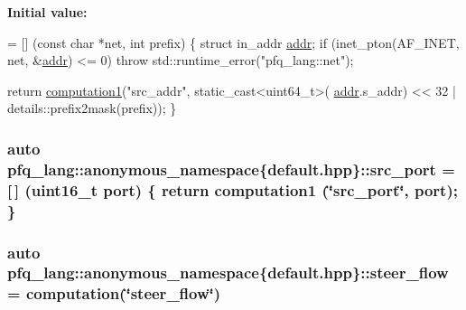 {\bfseries Initial value\-:}
\begin{DoxyCode}
= [] (\textcolor{keyword}{const} \textcolor{keywordtype}{char} *net, \textcolor{keywordtype}{int} prefix)
        \{
            \textcolor{keyword}{struct }in\_addr \hyperlink{namespacepfq__lang_1_1anonymous__namespace_02default_8hpp_03_aafce8334d1be83bff9a2115439c8c453}{addr};
            \textcolor{keywordflow}{if} (inet\_pton(AF\_INET, net, &\hyperlink{namespacepfq__lang_1_1anonymous__namespace_02default_8hpp_03_aafce8334d1be83bff9a2115439c8c453}{addr}) <= 0)
                \textcolor{keywordflow}{throw} std::runtime\_error(\textcolor{stringliteral}{"pfq\_lang::net"});

            \textcolor{keywordflow}{return} \hyperlink{namespacepfq__lang_a58e7e358fc7c95121f74d56c094b1627}{computation1}(\textcolor{stringliteral}{"src\_addr"}, static\_cast<uint64\_t>(
      \hyperlink{namespacepfq__lang_1_1anonymous__namespace_02default_8hpp_03_aafce8334d1be83bff9a2115439c8c453}{addr}.s\_addr) << 32 | details::prefix2mask(prefix));
        \}
\end{DoxyCode}
\hypertarget{namespacepfq__lang_1_1anonymous__namespace_02default_8hpp_03_ad4d03d1e69ba9608a2d87ac91a2b521f}{
\subsubsection[{src\-\_\-port}]{\setlength{\rightskip}{0pt plus 5cm}auto pfq\-\_\-lang\-::anonymous\-\_\-namespace\{default.\-hpp\}\-::src\-\_\-port = \mbox{[}$\,$\mbox{]} (uint16\-\_\-t {\bf port}) \{ return {\bf computation1} (\char`\"{}src\-\_\-port\char`\"{}, port); \}}}\label{namespacepfq__lang_1_1anonymous__namespace_02default_8hpp_03_ad4d03d1e69ba9608a2d87ac91a2b521f}
\hypertarget{namespacepfq__lang_1_1anonymous__namespace_02default_8hpp_03_aee7b4eb8c316f9c0cd6ee7bc22b517ef}{
\subsubsection[{steer\-\_\-flow}]{\setlength{\rightskip}{0pt plus 5cm}auto pfq\-\_\-lang\-::anonymous\-\_\-namespace\{default.\-hpp\}\-::steer\-\_\-flow = {\bf computation}(\char`\"{}steer\-\_\-flow\char`\"{})}}\label{namespacepfq__lang_1_1anonymous__namespace_02default_8hpp_03_aee7b4eb8c316f9c0cd6ee7bc22b517ef}
